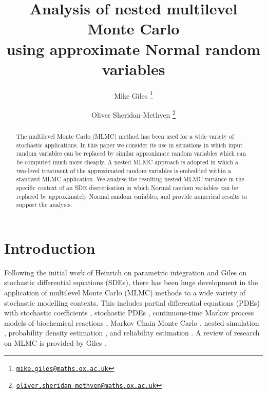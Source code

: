 \documentclass[11pt]{article}
\begin{document}
\title{Analysis of nested multilevel Monte Carlo \\ using approximate Normal random variables}

\author{
Mike Giles
\thanks{\href{mailto:mike.giles@maths.ox.ac.uk}%
{\texttt{mike.giles@maths.ox.ac.uk}}}
\and 
Oliver Sheridan-Methven
\thanks{\href{mailto:oliver.sheridan-methven@maths.ox.ac.uk}%
{\texttt{oliver.sheridan-methven@maths.ox.ac.uk}}}
}

\maketitle

\begin{abstract}
  The multilevel Monte Carlo (MLMC) method has been used for a wide variety
  of stochastic applications.  In this paper we consider its use in situations
  in which input random variables can be replaced by similar approximate random
  variables which can be computed much more cheaply.  A nested MLMC approach is
  adopted in which a two-level treatment of the approximated random variables
  is embedded within a standard MLMC application. We analyse the resulting
  nested MLMC variance in the specific context of an SDE discretisation in
  which Normal random variables can be replaced by approximately Normal
  random variables, and provide numerical results to support the analysis.
\end{abstract}


\section{Introduction}

Following the initial work of Heinrich \cite{heinrich98} on parametric
integration and Giles \cite{giles08} on stochastic differential equations
(SDEs), there has been huge development in the application of multilevel
Monte Carlo (MLMC) methods to a wide variety of stochastic modelling
contexts. This includes partial differential equations (PDEs) with
stochastic coefficients \cite{cgst11,bsz11}, stochastic PDEs \cite{gr12},
continuous-time Markov process models of biochemical reactions
\cite{ah12,ahs14},
Markov Chain Monte Carlo \cite{hss13,sst17},
nested simulation \cite{bhr15,gg19},
probability density estimation \cite{gnr15,bc16},
and reliability estimation \cite{up15,ehm16}.
A review of research on MLMC is provided by Giles \cite{giles15}.
\end{document}
